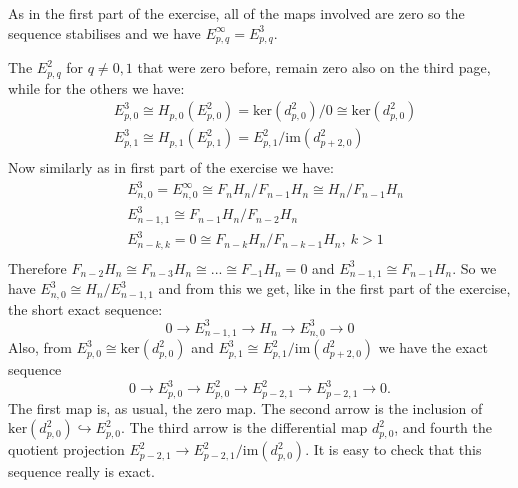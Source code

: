 \documentclass{article}
\begin{document}
\begin{center}\end{center}

As in the first part of the exercise, all of the maps involved are zero so the sequence stabilises and we have $E^\infty_{p,q} = E^3_{p,q}$.

The $E_{p,q}^2$ for $q \neq 0,1$ that were zero before, remain zero also on the third page, while for the others we have:
\begin{align*}
& E^3_{p,0} \cong H_{p,0}(E^2_{p,0}) = \mathrm{ker} (d^2_{p,0})/0 \cong \mathrm{ker} (d^2_{p,0}) \\
& E^3_{p,1} \cong H_{p,1}(E^2_{p,1}) = E^2_{p,1} / \mathrm{im}(d^2_{p+2,0}) \\
\end{align*} 
Now similarly as in first part of the exercise we have: 
\begin{align*}
&E^3_{n,0} = E^\infty_{n,0} \cong F_n H_n/F_{n-1}H_n \cong H_n/F_{n-1}H_n \\
& E^3_{n-1,1} \cong F_{n-1} H_n / F_{n-2} H_n \\
&E^3_{n-k,k} = 0 \cong F_{n-k} H_n / F_{n-k-1} H_n, \ k>1\\
\end{align*}
 Therefore $F_{n-2} H_n \cong F_{n-3} H_n \cong ... \cong F_{-1} H_n = 0$ and $E^3_{n-1,1} \cong F_{n-1} H_n$. So we have $E^3_{n,0} \cong H_n/E^3_{n-1,1}$ and from this we get, like in the first part of the exercise, the short exact sequence:
\begin{equation*}
0 \to E^3_{n-1,1} \to H_n \to E^3_{n,0} \to 0
\end{equation*}
Also, from $E^3_{p,0} \cong \mathrm{ker}(d^2_{p,0})$ and $E^3_{p,1} \cong E^2_{p,1}/\mathrm{im}(d^2_{p+2,0})$ we have the exact sequence
\begin{equation*}
0 \to E^3_{p,0} \to E^2_{p,0} \to E^2_{p-2,1} \to E^3_{p-2,1} \to 0.
\end{equation*}
The first map is, as usual, the zero map. The second arrow is the inclusion of $\mathrm{ker}(d^2_{p,0}) \hookrightarrow E^2_{p,0}$. The third arrow is the differential map $d^2_{p,0}$, and fourth the quotient projection $E^2_{p-2,1} \to E^2_{p-2,1}/\mathrm{im}(d^2_{p,0})$. It is easy to check that this sequence really is exact.
\end{document}
